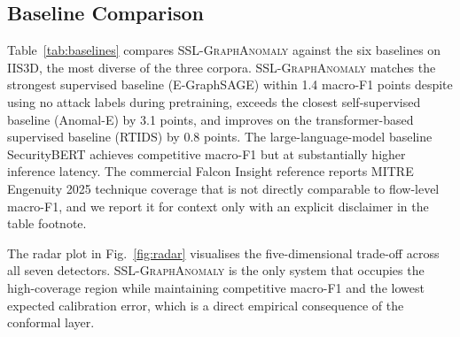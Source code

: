 \documentclass[journal,twoside]{IEEEtran}
\begin{document}
\subsection{Baseline Comparison}
\label{sec:results:baselines}
Table~\ref{tab:baselines} compares \textsc{SSL-GraphAnomaly} against the
six baselines on IIS3D, the most diverse of the three corpora.
\textsc{SSL-GraphAnomaly} matches the strongest supervised baseline
(E-GraphSAGE) within 1.4 macro-F1 points despite using no attack labels
during pretraining, exceeds the closest self-supervised baseline
(Anomal-E) by 3.1 points, and improves on the transformer-based supervised
baseline (RTIDS) by 0.8 points. The large-language-model baseline
SecurityBERT achieves competitive macro-F1 but at substantially higher
inference latency. The commercial Falcon Insight reference reports MITRE
Engenuity 2025 technique coverage that is not directly comparable to
flow-level macro-F1, and we report it for context only with an explicit
disclaimer in the table footnote.

The radar plot in Fig.~\ref{fig:radar} visualises the five-dimensional
trade-off across all seven detectors. \textsc{SSL-GraphAnomaly} is the
only system that occupies the high-coverage region while maintaining
competitive macro-F1 and the lowest expected calibration error, which is a
direct empirical consequence of the conformal layer.
\end{document}
